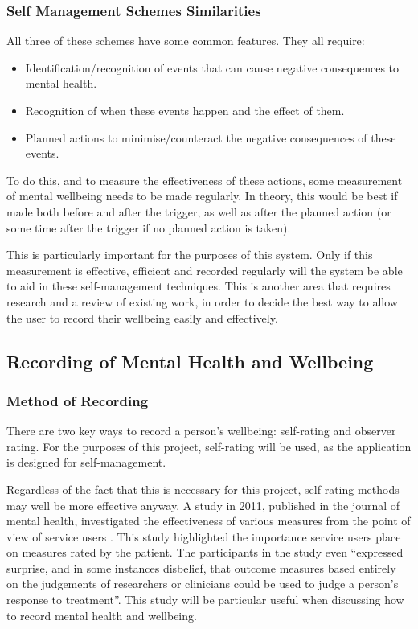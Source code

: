 \documentclass[11pt,openright,a4paper]{report}
\begin{document}
\subsubsection{Self Management Schemes Similarities}
All three of these schemes have some common features. They all require:
\begin{itemize}
\item Identification/recognition of events that can cause negative consequences to mental health.
\item Recognition of when these events happen and the effect of them.
\item Planned actions to minimise/counteract the negative consequences of these events.
\end{itemize}

To do this, and to measure the effectiveness of these actions, some measurement of mental wellbeing needs to be made regularly. In theory, this would be best if made both before and after the trigger, as well as after the planned action (or some time after the trigger if no planned action is taken).

This is particularly important for the purposes of this system. Only if this measurement is effective, efficient and recorded regularly will the system be able to aid in these self-management techniques. This is another area that requires research and a review of existing work, in order to decide the best way to allow the user to record their wellbeing easily and effectively.

\subsection{Recording of Mental Health and Wellbeing} \label{recordingmentalhealth}
\subsubsection{Method of Recording} \label{methodofrecording}
There are two key ways to record a person's wellbeing: self-rating and observer rating. For the purposes of this project, self-rating will be used, as the application is designed for self-management.

Regardless of the fact that this is necessary for this project, self-rating methods may well be more effective anyway. A study in 2011, published in the journal of mental health, investigated the effectiveness of various measures from the point of view of service users \parencite{crawford2011selecting}. This study highlighted the importance service users place on measures rated by the patient. The participants in the study even \enquote{expressed surprise, and in some instances disbelief, that outcome measures based entirely on the judgements of researchers or clinicians could be used to judge a person’s response to treatment}. This study will be particular useful when discussing how to record mental health and wellbeing.
\end{document}
